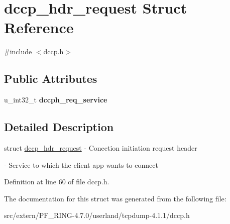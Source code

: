 \hypertarget{structdccp__hdr__request}{
\section{dccp\_\-hdr\_\-request Struct Reference}
\label{structdccp__hdr__request}
}


{\ttfamily \#include $<$dccp.h$>$}

\subsection*{Public Attributes}
\begin{DoxyCompactItemize}
\item 
\hypertarget{structdccp__hdr__request_ad11a2fd2708c3924989cd3ed2edc04f8}{
u\_\-int32\_\-t {\bfseries dccph\_\-req\_\-service}}
\label{structdccp__hdr__request_ad11a2fd2708c3924989cd3ed2edc04f8}

\end{DoxyCompactItemize}


\subsection{Detailed Description}
struct \hyperlink{structdccp__hdr__request}{dccp\_\-hdr\_\-request} -\/ Conection initiation request header

-\/ Service to which the client app wants to connect 

Definition at line 60 of file dccp.h.



The documentation for this struct was generated from the following file:\begin{DoxyCompactItemize}
\item 
src/extern/PF\_\-RING-\/4.7.0/userland/tcpdump-\/4.1.1/dccp.h\end{DoxyCompactItemize}
